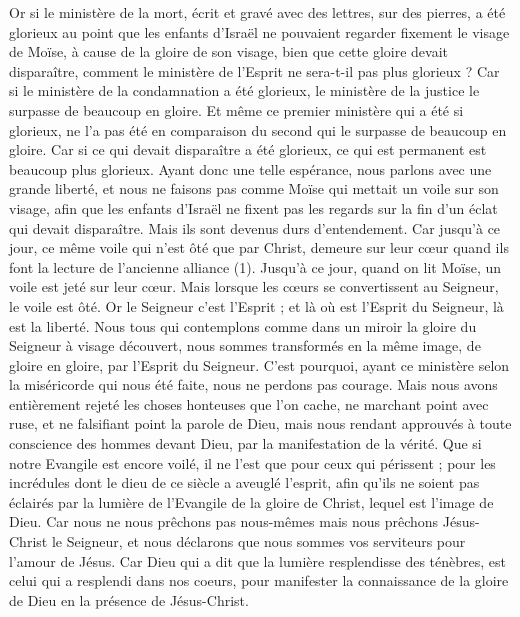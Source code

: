 \begin{multicols}{2}
Or si le ministère de la mort, écrit et gravé avec des lettres, sur des pierres, a été glorieux au point que les enfants d'Israël ne pouvaient regarder fixement le visage de Moïse, à cause de la gloire de son visage, bien que cette gloire devait disparaître,
comment le ministère de l'Esprit ne sera-t-il pas plus glorieux ?
Car si le ministère de la condamnation a été glorieux, le ministère de la justice le surpasse de beaucoup en gloire.
Et même ce premier ministère qui a été si glorieux, ne l'a pas été en comparaison du second qui le surpasse de beaucoup en gloire.
Car si ce qui devait disparaître a été glorieux, ce qui est permanent est beaucoup plus glorieux.
Ayant donc une telle espérance, nous parlons avec une grande liberté,
et nous ne faisons pas comme Moïse qui mettait un voile sur son visage, afin que les enfants d'Israël ne fixent pas les regards sur la fin d’un éclat qui devait disparaître.
Mais ils sont devenus durs d’entendement. Car jusqu'à ce jour, ce même voile qui n’est ôté que par Christ, demeure sur leur cœur quand ils font la lecture de l'ancienne alliance\FTNT{} (1).
Jusqu'à ce jour, quand on lit Moïse, un voile est jeté sur leur cœur.
Mais lorsque les cœurs se convertissent au Seigneur, le voile est ôté.
Or le Seigneur c’est l’Esprit ; et là où est l'Esprit du Seigneur, là est la liberté.
Nous tous qui contemplons comme dans un miroir la gloire du Seigneur à visage découvert, nous sommes transformés en la même image, de gloire en gloire, par l'Esprit du Seigneur.
\VerseOne{}C'est pourquoi, ayant ce ministère selon la miséricorde qui nous été faite, nous ne perdons pas courage.
Mais nous avons entièrement rejeté les choses honteuses que l'on cache, ne marchant point avec ruse, et ne falsifiant point la parole de Dieu, mais nous rendant approuvés à toute conscience des hommes devant Dieu, par la manifestation de la vérité.
Que si notre Evangile est encore voilé, il ne l'est que pour ceux qui périssent ;
pour les incrédules dont le dieu de ce siècle a aveuglé l’esprit, afin qu’ils ne soient pas éclairés par la lumière de l'Evangile de la gloire de Christ, lequel est l'image de Dieu.
Car nous ne nous prêchons pas nous-mêmes mais nous prêchons Jésus-Christ le Seigneur, et nous déclarons que nous sommes vos serviteurs pour l'amour de Jésus.
Car Dieu qui a dit que la lumière resplendisse des ténèbres, est celui qui a resplendi dans nos coeurs, pour manifester la connaissance de la gloire de Dieu en la présence de Jésus-Christ.

\end{multicols}
